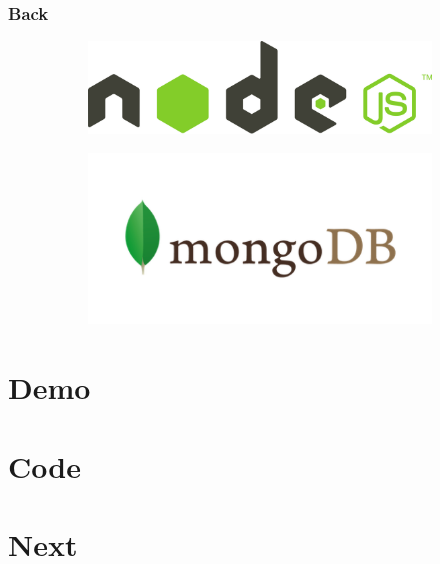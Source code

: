 \documentclass[10pt, compress]{beamer}
\begin{document}
\begin{frame}[fragile]

  \frametitle{Back}

  \begin{figure}
    \centering
    \begin{subfigure}{.75\textwidth}
      \centering
      \includegraphics[width=\linewidth]{images/nodejs}
    \end{subfigure}
    
    \begin{subfigure}{.75\textwidth}
      \centering
      \includegraphics[width=\linewidth]{images/mongodb}
    \end{subfigure}
  \end{figure}

\end{frame}

\section{Demo}

\section{Code}

\section{Next}
\end{document}

